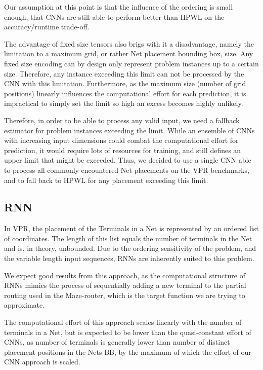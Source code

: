 Our assumption at this point is that the influence of the ordering is small enough, that \glspl{CNN} are still able to perform better than \gls{HPWL} on the accuracy/runtime trade-off.

The advantage of fixed size tensors also brigs with it a disadvantage, namely the limitation to a maximum grid, or rather Net placement bounding box, size. Any fixed size encoding can by design only represent problem instances up to a certain size. Therefore, any instance exceeding this limit can not be processed by the \gls{CNN} with this limitation. Furthermore, as the maximum size (number of grid positions) linearly influences the computational effort for each prediction, it is impractical to simply set the limit so high an excess becomes highly unlikely.

Therefore, in order to be able to process any valid input, we need a fallback estimator for problem instances exceeding the limit. While an ensemble of \glspl{CNN} with increasing input dimensions could combat the computational effort for prediction, it would require lots of resources for training, and still defines an upper limit that might be exceeded. Thus, we decided to use a single \gls{CNN} able to process all commonly encountered Net placements on the \gls{VPR} benchmarks, and to fall back to \gls{HPWL} for any placement exceeding this limit.

\subsection{\gls{RNN}}

In \gls{VPR}, the placement of the Terminals in a Net is represented by an ordered list of coordinates. The length of this list equals the number of terminals in the Net and is, in theory, unbounded. Due to the ordering sensitivity of the problem, and the variable length input sequences, \glspl{RNN} are inherently suited to this problem.

We expect good results from this approach, as the computational structure of \glspl{RNN} mimics the process of sequentially adding a new terminal to the partial routing used in the Maze-router, which is the target function we are trying to approximate.

The computational effort of this approach scales linearly with the number of terminals in a Net, but is expected to be lower than the quasi-constant effort of \glspl{CNN}, as number of terminals is generally lower than number of distinct placement positions in the Nets \gls{BB}, by the maximum of which the effort of our CNN approach is scaled.

